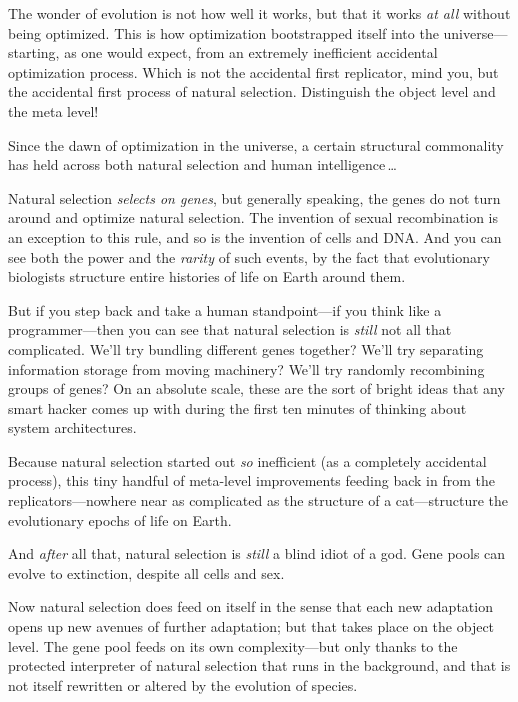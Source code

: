 {{
 The wonder of evolution is not how well it works, but that it
works \textit{at all} without being optimized. This is how optimization
bootstrapped itself into the universe---starting, as one would expect,
from an extremely inefficient accidental optimization process. Which is
not the accidental first replicator, mind you, but the accidental first
process of natural selection. Distinguish the object level and the meta
level!}

{
 Since the dawn of optimization in the universe, a certain
structural commonality has held across both natural selection and human
intelligence\,\ldots}

{
 Natural selection \textit{selects on genes}, but generally
speaking, the genes do not turn around and optimize natural selection.
The invention of sexual recombination is an exception to this rule, and
so is the invention of cells and DNA. And you can see both the power
and the \textit{rarity} of such events, by the fact that evolutionary
biologists structure entire histories of life on Earth around them.}

{
 But if you step back and take a human standpoint---if you think
like a programmer---then you can see that natural selection is
\textit{still} not all that complicated. We'll try
bundling different genes together? We'll try separating
information storage from moving machinery? We'll try
randomly recombining groups of genes? On an absolute scale, these are
the sort of bright ideas that any smart hacker comes up with during the
first ten minutes of thinking about system architectures.}

{
 Because natural selection started out \textit{so} inefficient (as
a completely accidental process), this tiny handful of meta-level
improvements feeding back in from the replicators---nowhere near as
complicated as the structure of a cat---structure the evolutionary
epochs of life on Earth.}

{
 And \textit{after} all that, natural selection is \textit{still} a
blind idiot of a god. Gene pools can evolve to extinction, despite all
cells and sex.}

{
 Now natural selection does feed on itself in the sense that each
new adaptation opens up new avenues of further adaptation; but that
takes place on the object level. The gene pool feeds on its own
complexity---but only thanks to the protected interpreter of natural
selection that runs in the background, and that is not itself rewritten
or altered by the evolution of species.}

}
